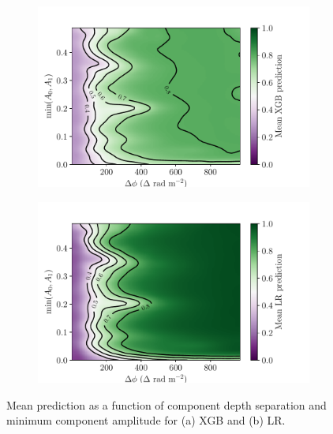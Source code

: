 \documentclass[11pt, a4paper]{book}
\begin{document}
    \begin{figure}
      \begin{subfigure}{\linewidth}
        \includegraphics[width=\linewidth]{faraday-images/mean_xgb_prediction_dphi_amp.pdf}
        \caption{\label{fig:faraday-mean-xgb-pred}}
      \end{subfigure}
      \begin{subfigure}{\linewidth}
        \includegraphics[width=\linewidth]{faraday-images/mean_lr_prediction_dphi_amp.pdf}
        \caption{\label{fig:faraday-mean-lr-pred}}
      \end{subfigure}
      \caption[Mean prediction as a function of component depth separation and minimum component amplitude for XGB and LR.]{\label{fig:faraday-amps-dphi-mean} Mean prediction as a function of component depth separation and minimum component amplitude for (a) XGB and (b) LR.}
    \end{figure}
\end{document}
